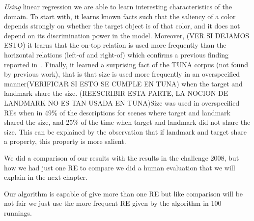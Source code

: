 \textit{Using} linear regression we are able to learn interesting characteristics of the domain. To start with, it learns known facts such that the 
saliency of a color depends strongly on whether the target object is of that color, and it does not depend on its discrimination power 
in the model. Moreover, (VER SI DEJAMOS ESTO) it learns that the on-top relation is used more frequently than the horizontal relations (left-of and right-of) 
which confirms a previous finding reported in~\cite{viet:gene11}. Finally, it learned a surprising fact of the TUNA corpus
 (not found by previous work), that is that size is used more frequently in an overspecified manner(VERIFICAR SI ESTO SE CUMPLE EN TUNA) when the target and landmark share the
 size. (REESCRIBIR ESTA PARTE, LA NOCION DE LANDMARK NO ES TAN USADA EN TUNA)Size was used in overspecified REs when in 49\% of the descriptions for scenes where target and landmark shared the size, and 25\% 
of the time when target and landmark did not share the size. This can be explained by the observation that if landmark and target share a
 property, this property is more salient. 

We did a comparison of our results with the results in the challenge 2008, but how we had just one RE to compare we did a human evaluation that we will explain in the next chapter.

Our algorithm is capable of give more than one RE but like comparison will be not fair we just use the more frequent RE given by the algorithm in 100 runnings.

